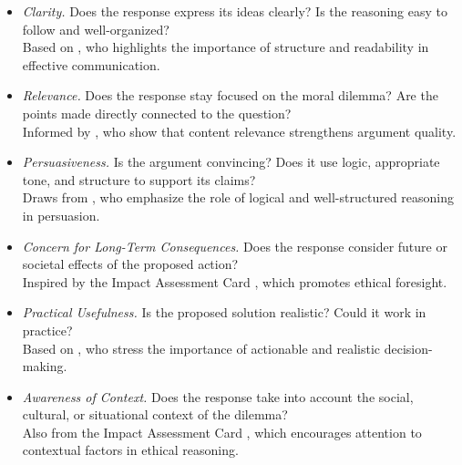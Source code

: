 \begin{itemize}
  \item \textit{Clarity.} Does the response express its ideas clearly? Is the reasoning easy to follow and well-organized?\\
    \hspace*{0.5em}Based on \citet{mctear2005spoken}, who highlights the importance of structure and readability in effective communication.

  \item \textit{Relevance.} Does the response stay focused on the moral dilemma? Are the points made directly connected to the question?\\
    \hspace*{0.5em}Informed by \citet{habernal2016argument}, who show that content relevance strengthens argument quality.

  \item \textit{Persuasiveness.} Is the argument convincing? Does it use logic, appropriate tone, and structure to support its claims?\\
    \hspace*{0.5em}Draws from \citet{johnson2006logical}, who emphasize the role of logical and well-structured reasoning in persuasion.

  \item \textit{Concern for Long-Term Consequences.} Does the response consider future or societal effects of the proposed action?\\
    \hspace*{0.5em}Inspired by the Impact Assessment Card \citep{impactassessment2018cscw}, which promotes ethical foresight.

  \item \textit{Practical Usefulness.} Is the proposed solution realistic? Could it work in practice?\\
    \hspace*{0.5em}Based on \citet{bazerman2012judgment}, who stress the importance of actionable and realistic decision-making.

  \item \textit{Awareness of Context.} Does the response take into account the social, cultural, or situational context of the dilemma?\\
    \hspace*{0.5em}Also from the Impact Assessment Card \citep{impactassessment2018cscw}, which encourages attention to contextual factors in ethical reasoning.
\end{itemize}



